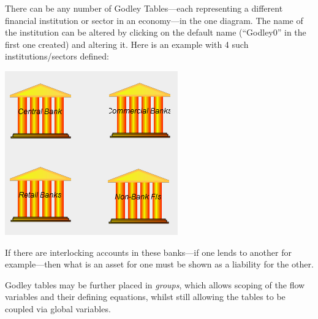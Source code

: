 There can be any number of Godley Tables---each representing a different
financial institution or sector in an economy---in the one diagram.
The name of the institution can be altered by clicking on the default
name (``Godley0'' in the first one created) and altering it. Here
is an example with 4 such institutions/sectors defined:
\begin{center}
\includegraphics{images/NewItem136} 
\par\end{center}

If there are interlocking accounts in these banks---if one lends
to another for example---then what is an asset for one must be shown
as a liability for the other.

Godley tables may be further placed in {\em groups}, which allows
scoping of the flow variables and their defining equations, whilst
still allowing the tables to be coupled via global variables.

